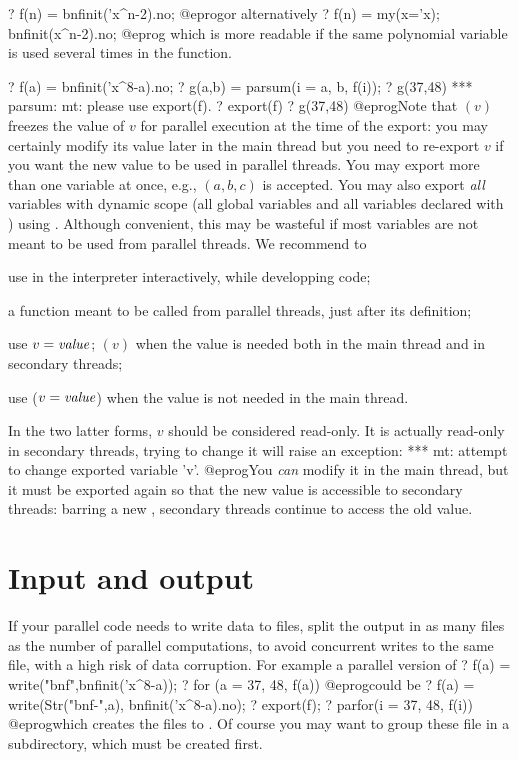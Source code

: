 \bprog
? f(n) = bnfinit('x^n-2).no;
@eprog\noindent or alternatively
\bprog
? f(n) = my(x='x); bnfinit(x^n-2).no;
@eprog
which is more readable if the same polynomial variable is used several times
in the function.


\bprog
? f(a) = bnfinit('x^8-a).no;
? g(a,b) = parsum(i = a, b, f(i));
? g(37,48)
  *** parsum: mt: please use export(f).
? export(f)
? g(37,48)
@eprog\noindent Note that $(v)$ freezes the value of $v$
for parallel execution at the time of the export: you may certainly modify
its value later in the main thread but you need to re-export $v$ if you want
the new value to be used in parallel threads. You may export more than one
variable at once, e.g., $(a,b,c)$ is accepted. You may also
export \emph{all} variables with dynamic scope (all global variables
and all variables declared with ) using .
Although convenient, this may be wasteful if most variables are not meant to
be used from parallel threads. We recommend to

\item use  in the  interpreter interactively, while
  developping code;

\item {} a function meant to be called from parallel
  threads, just after its definition;

\item use $v = \hbox{\it value\/}$; $(v)$ when the value
  is needed both in the main thread and in secondary threads;

\item use ($v = \hbox{\it value\/}$) when the value is
  not needed in the main thread.

\noindent In the two latter forms, $v$ should be considered read-only. It is
actually read-only in secondary threads, trying to change it will raise an
exception:
\bprog
  ***   mt: attempt to change exported variable 'v'.
@eprog\noindent You \emph{can} modify it in the main thread, but it must be
exported again so that the new value is accessible to secondary threads:
barring a new , secondary threads continue to access the old value.

\section{Input and output} If your parallel code needs to write data to
files, split the output in as many files as the number of parallel
computations, to avoid concurrent writes to the same file, with a high risk
of data corruption. For example a parallel version of
\bprog
? f(a) = write("bnf",bnfinit('x^8-a));
? for (a = 37, 48, f(a))
@eprog\noindent could be
\bprog
? f(a) = write(Str("bnf-",a), bnfinit('x^8-a).no);
? export(f);
? parfor(i = 37, 48, f(i))
@eprog\noindent which creates the files  to . Of
course you may want to group these file in a subdirectory, which must be
created first.

